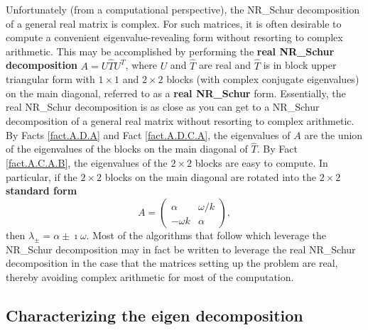 Unfortunately (from a computational perspective), the NR_Schur decomposition of a general real matrix is complex.
For such matrices, it is often desirable to compute a convenient eigenvalue-revealing form without resorting to
complex arithmetic.  This may be accomplished by performing the {\bf real NR_Schur decomposition} $A=U \hat T U^T$, 
where $U$ and $\hat T$ are real and $\hat T$ is in block upper triangular form with $1\times 1$ and $2\times 2$
blocks (with complex conjugate eigenvalues) on the main diagonal, referred to as a {\bf real NR_Schur} form.  
Essentially, the real NR_Schur decomposition is as close as you can get to a NR_Schur decomposition of a
general real matrix without resorting to complex arithmetic.
By Facts \ref{fact.A.D.A} and Fact \ref{fact.A.D.C.A}, the eigenvalues of $A$ are the
union of the eigenvalues of the blocks on the main diagonal of $\hat T$.  By Fact \ref{fact.A.C.A.B}, the eigenvalues of
the $2\times 2$ blocks are easy to compute.
In particular, if the $2\times 2$ blocks on the main diagonal are rotated into the {\bf $2\times 2$ standard form}
\begin{equation}
A=\begin{pmatrix} \alpha & \omega/k \\ -\omega k & \alpha \end{pmatrix},
\label{2by2standardform}
\end{equation}
then $\lambda_{\pm}=\alpha\pm \imath \omega$.  Most of the algorithms that follow which leverage the NR_Schur decomposition may
in fact be written to leverage the real NR_Schur decomposition in the case that the matrices setting up the problem are real, thereby
avoiding complex arithmetic for most of the computation.

\subsection{Characterizing the eigen decomposition}\label{sec.A.D.D}

